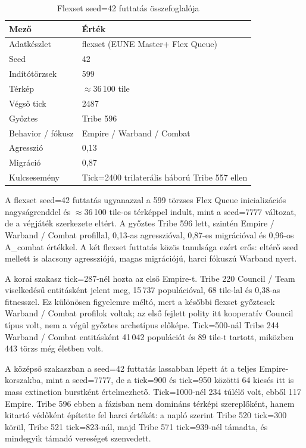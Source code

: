 \begin{table}[h]
\centering
\caption{Flexset seed=42 futtatás összefoglalója}
\label{tab:neurosim-run-fl42-summary}
\begin{tabular}{ll}
\hline
\textbf{Mező} & \textbf{Érték} \\
\hline
Adatkészlet & flexset (EUNE Master+ Flex Queue) \\
Seed & 42 \\
Indítótörzsek & 599 \\
Térkép & $\approx$36\,100 tile \\
Végső tick & 2487 \\
Győztes & Tribe 596 \\
Behavior / fókusz & Empire / Warband / Combat \\
Agresszió & 0,13 \\
Migráció & 0,87 \\
Kulcsesemény & Tick=2400 trilaterális háború Tribe 557 ellen \\
\hline
\end{tabular}
\end{table}

A flexset seed=42 futtatás ugyanazzal a 599 törzses Flex Queue inicializációs nagyságrenddel és $\approx$36\,100 tile-os térképpel indult, mint a seed=7777 változat, de a végjáték szerkezete eltért. A győztes Tribe 596 lett, szintén Empire / Warband / Combat profillal, 0,13-as agresszióval, 0,87-es migrációval és 0,96-os A\_combat értékkel. A két flexset futtatás közös tanulsága ezért erős: eltérő seed mellett is alacsony agressziójú, magas migrációjú, harci fókuszú Warband nyert.

A korai szakasz tick=287-nél hozta az első Empire-t. Tribe 220 Council / Team viselkedésű entitásként jelent meg, 15\,737 populációval, 68 tile-lal és 0,38-as fitnesszel. Ez különösen figyelemre méltó, mert a későbbi flexset győztesek Warband / Combat profilok voltak; az első fejlett polity itt kooperatív Council típus volt, nem a végül győztes archetípus előképe. Tick=500-nál Tribe 244 Warband / Combat entitásként 41\,042 populációt és 89 tile-t tartott, miközben 443 törzs még életben volt.

A középső szakaszban a seed=42 futtatás lassabban lépett át a teljes Empire-korszakba, mint a seed=7777, de a tick=900 és tick=950 közötti 64 kiesés itt is mass extinction burstként értelmezhető. Tick=1000-nél 234 túlélő volt, ebből 117 Empire. Tribe 596 ebben a fázisban nem domináns térképi szereplőként, hanem kitartó védőként építette fel harci értékét: a napló szerint Tribe 520 tick=300 körül, Tribe 521 tick=823-nál, majd Tribe 571 tick=939-nél támadta, és mindegyik támadó vereséget szenvedett.

